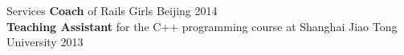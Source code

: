 \documentclass{resume} %
\begin{document}
%
%


\begin{rSection}{Services}
\textbf{Coach} of Rails Girls Beijing \hfill 2014\\
\textbf{Teaching Assistant} for the C++ programming course at Shanghai Jiao Tong University \hfill 2013\\
\end{rSection}

\end{document}
